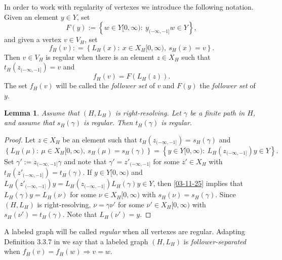 \documentclass[12pt,oneside,english]{amsart}
\newtheorem{lemma}[thm]{Lemma}
\begin{document}
In order to work with regularity of vertexes we introduce the following notation. Given an element $y \in Y$, set
\begin{equation}\label{23-09-25a}
F(y) := \left\{w \in Y[0,\infty): \ y_{(-\infty,-1]}w \in Y \right\} ,
\end{equation}
and given a vertex $v \in V_H$, set
$$
f_H(v) : = \left\{L_H(x): \ x \in X_H[0,\infty), \ s_H(x) = v \right\} .
$$
Then $v \in V_H$ is regular when there is an element $z \in X_H$ such that $t_H(z_{(-\infty,-1]}) =v$ and 
\begin{equation}\label{15-09-12}
f_H(v) = F(L_H(z)) .
\end{equation}
The set $f_H(v)$ will be called the \emph{follower set} of $v$ and $F(y)$ the \emph{follower set} of $y$.


















\begin{lemma}\label{31-08-25x} Assume that $(H,L_H)$ is right-resolving. Let $\gamma$ be a finite path in $H$, and assume that $s_H(\gamma)$ is regular. Then $t_H(\gamma)$ is regular.
\end{lemma}
\begin{proof} Let $z \in X_H$ be an element such that $t_H(z_{(-\infty,-1]}) = s_H(\gamma)$ and
\begin{equation}\label{03-11-25}
 \left\{ L_H(\mu) : \ \mu \in X_H{[0,\infty)}, \ s_H(\mu) =s_H(\gamma)   \right\} = \left\{y \in Y[0,\infty) : \ L_H(z_{(-\infty,-1]})y \in Y \right\} .
\end{equation}
 Set $\gamma' := z_{(-\infty,-1]}\gamma$ and note that $\gamma' = z'_{(-\infty,-1]}$ for some $z' \in X_H$ with $t_H(z'_{(-\infty,-1]}) = t_H(\gamma)$. If $y\in Y[0,\infty)$ and $L_H(z'_{(-\infty,-1]})y = L_H( z_{(-\infty,-1]})L_H(\gamma)y \in Y$, then \eqref{03-11-25} implies that $L_H(\gamma)y = L_H(\nu)$ for some $\nu \in X_H[0,\infty)$ with $s_H(\nu) = s_H(\gamma)$. Since $(H,L_H)$ is right-resolving, $\nu = \gamma \nu'$ for some $\nu' \in X_H[0,\infty)$ with $s_H(\nu') = t_H(\gamma)$. Note that $L_H(\nu') = y$.
\end{proof}


A labeled graph will be called \emph{regular} when all vertexes are regular. Adapting Definition 3.3.7 in \cite{LM} we say that a labeled graph $(H,L_H)$ is \emph{follower-separated} when $f_H(v) = f_H(w) \Rightarrow v =w$.
\end{document}
